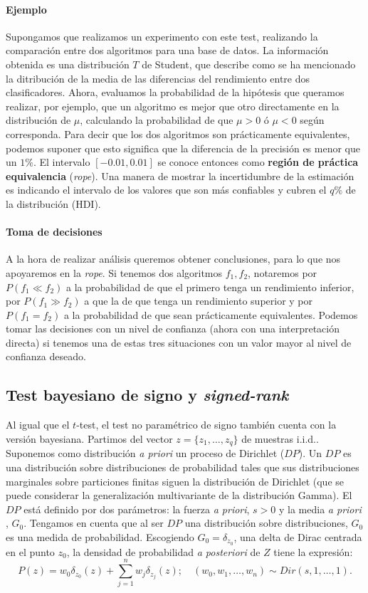 \paragraph{Ejemplo} Supongamos que realizamos un experimento
con este test, realizando la comparación entre dos algoritmos
para una base de datos. La información obtenida es una 
distribución $T$ de Student, que describe como se ha mencionado
la ditribución de la media de las diferencias del rendimiento
entre dos clasificadores. Ahora, evaluamos la probabilidad 
de la hipótesis que queramos realizar, por ejemplo, que un 
algoritmo es mejor que otro directamente en la distribución
de $\mu$, calculando la probabilidad de que $\mu > 0$ ó $\mu 
< 0$ según corresponda. Para decir que los dos algoritmos son
prácticamente equivalentes, podemos suponer que esto 
significa que la diferencia de la precisión es menor que un
$1\%$. El intervalo $[-0.01, 0.01]$ se conoce entonces como
\textbf{región de práctica equivalencia} (\textit{rope}). Una manera 
de mostrar la incertidumbre de la estimación es indicando el 
intervalo de los valores que son más confiables y cubren el 
$q\%$ de la distribución (HDI). 

\paragraph{Toma de decisiones} A la hora de realizar 
análisis queremos obtener conclusiones, para lo que nos 
apoyaremos en la \textit{rope}. Si tenemos dos algoritmos $f_1, f_2$, 
notaremos por $P(f_1 \ll f_2)$ a la probabilidad de que el 
primero tenga un rendimiento inferior, por $P(f_1 \gg f_2)$ a 
que la de que tenga un rendimiento superior y por $P(f_1 =
f_2)$ a la probabilidad de que sean prácticamente 
equivalentes. Podemos tomar las decisiones con un nivel
de confianza (ahora con una interpretación directa) si
tenemos una de estas tres situaciones con un valor mayor
al nivel de confianza deseado.

\subsection{Test bayesiano de signo y \textit{signed-rank}}

	Al igual que el $t$-test, el test no paramétrico de 
signo también cuenta con la versión bayesiana. Partimos
del vector $z = \{z_1, \dots, z_q\}$ de muestras i.i.d.. 
Suponemos como distribución \textit{a priori} un proceso
de Dirichlet ($DP$). Un $DP$ es una distribución sobre 
distribuciones de probabilidad tales que sus distribuciones
marginales sobre particiones finitas siguen la distribución
de Dirichlet (que se puede considerar la generalización
multivariante de la distribución Gamma). El $DP$ está
definido por dos parámetros: la fuerza \textit{a priori},
$s>0$ y la media \textit{a priori} , $G_0$. Tengamos en 
cuenta que al ser $DP$ una distribución sobre distribuciones,
$G_0$ es una medida de probabilidad. Escogiendo $G_0 = 
\delta_{z_0}$, una delta de Dirac centrada en el punto $z_0$,
la densidad de probabilidad \textit{a posteriori} de $Z$ tiene la
expresión:
	\[ P(z) = 
		w_0 \delta_{z_0}(z) +
			\sum\limits_{j=1}^n
				w_j \delta_{z_j}(z); \quad
		(w_0, w_1, \dots, w_n) \sim Dir(s,1, \dots, 1).
	\] 
	

